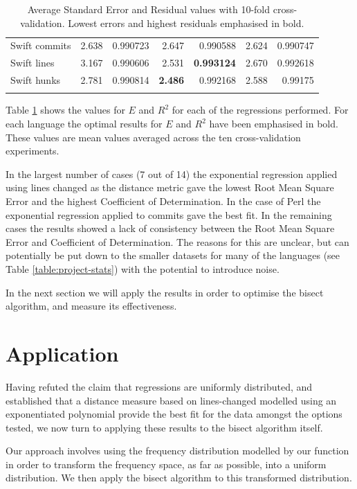 \documentclass[pdflatex, sn-mathphys, referee]{sn-jnl}%
\theoremstyle{thmstyleone}%
\theoremstyle{thmstyletwo}%
\theoremstyle{thmstylethree}%
\theoremstyle{thmstyleone}
\begin{document}
\begin{table}[ht]
\begin{center}
\begin{minipage}{\textwidth}
\begin{tabular*}{\textwidth}{l r r r r r r}
Swift commits & 2.638 & 0.990723 & 2.647 & 0.990588 & 2.624 & 0.990747 \\
Swift lines & 3.167 & 0.990606 & 2.531 & {\bf 0.993124} & 2.670 & 0.992618 \\
Swift hunks & 2.781 & 0.990814 & {\bf 2.486} & 0.992168 & 2.588 & 0.99175 \\
\botrule
\end{tabular*}
\caption{\label{table:regression}Average Standard Error and Residual values with 10-fold cross-validation. Lowest errors and highest residuals emphasised in bold.}
\end{minipage}
\end{center}
\end{table}

Table \ref{table:regression} shows the values for $E$ and $R^2$ for each of the regressions performed. For each language the optimal results for $E$ and $R^2$ have been emphasised in bold. These values are mean values averaged across the ten cross-validation experiments.

In the largest number of cases (7 out of 14) the exponential regression applied using lines changed as the distance metric gave the lowest Root Mean Square Error and the highest Coefficient of Determination. In the case of Perl the exponential regression applied to commits gave the best fit. In the remaining cases the results showed a lack of consistency between the Root Mean Square Error and Coefficient of Determination. The reasons for this are unclear, but can potentially be put down to the smaller datasets for many of the languages (see Table \ref{table:project-stats}) with the potential to introduce noise.

In the next section we will apply the results in order to optimise the bisect algorithm, and measure its effectiveness.

\section{Application}
\label{section:application}

Having refuted the claim that regressions are uniformly distributed, and established that a distance measure based on lines-changed modelled using an exponentiated polynomial provide the best fit for the data amongst the options tested, we now turn to applying these results to the bisect algorithm itself.

Our approach involves using the frequency distribution modelled by our function in order to transform the frequency space, as far as possible, into a uniform distribution. We then apply the bisect algorithm to this transformed distribution.
\end{document}
